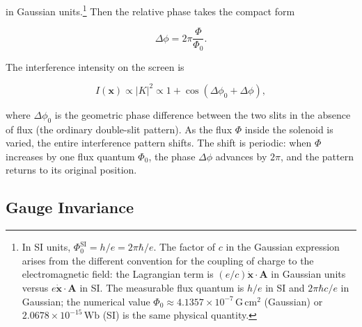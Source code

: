 in Gaussian units.\footnote{In SI units, $\Phi_0^{\text{SI}} = h/e = 2\pi\hbar/e$. The factor of $c$ in the Gaussian expression arises from the different convention for the coupling of charge to the electromagnetic field: the Lagrangian term is $(e/c)\dot{\bm x}\cdot\bm A$ in Gaussian units versus $e\dot{\bm x}\cdot\bm A$ in SI. The measurable flux quantum is $h/e$ in SI and $2\pi\hbar c/e$ in Gaussian; the numerical value $\Phi_0 \approx 4.1357\times 10^{-7}\,\text{G}\,\text{cm}^2$ (Gaussian) or $2.0678\times 10^{-15}\,\text{Wb}$ (SI) is the same physical quantity.} Then the relative phase takes the compact form
\begin{linenomath}
\begin{equation}
\Delta\phi = 2\pi\frac{\Phi}{\Phi_0}.
\label{eq:ab-phase-shift}
\end{equation}
\end{linenomath}

The interference intensity on the screen is
\begin{linenomath}
\begin{equation}
I(\bm x) \propto |K|^2 \propto 1 + \cos(\Delta\phi_0 + \Delta\phi),
\end{equation}
\end{linenomath}
where $\Delta\phi_0$ is the geometric phase difference between the two slits in the absence of flux (the ordinary double-slit pattern). As the flux $\Phi$ inside the solenoid is varied, the entire interference pattern shifts. The shift is periodic: when $\Phi$ increases by one flux quantum $\Phi_0$, the phase $\Delta\phi$ advances by $2\pi$, and the pattern returns to its original position.

\subsection{Gauge Invariance}

